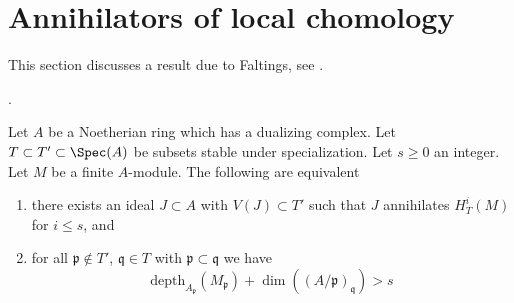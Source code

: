 \section{Annihilators of local chomology}
\label{section-annihilators}

\noindent
This section discusses a result due to Faltings, see
\cite{Faltings-annulators}.

\begin{proposition}
\label{proposition-annihilator}
\begin{reference}
\cite{Faltings-annulators}.
\end{reference}
Let $A$ be a Noetherian ring which has a dualizing complex.
Let $T \subset T' \subset \Spec(A)$ be subsets stable under
specialization. Let $s \geq 0$ an integer. Let $M$ be a finite $A$-module.
The following are equivalent
\begin{enumerate}
\item there exists an ideal $J \subset A$ with $V(J) \subset T'$
such that $J$ annihilates $H^i_T(M)$ for $i \leq s$, and
\item for all $\mathfrak p \not \in T'$,
$\mathfrak q \in T$ with $\mathfrak p \subset \mathfrak q$
we have
$$
\text{depth}_{A_\mathfrak p}(M_\mathfrak p) +
\dim((A/\mathfrak p)_\mathfrak q) > s
$$
\end{enumerate}
\end{proposition}

